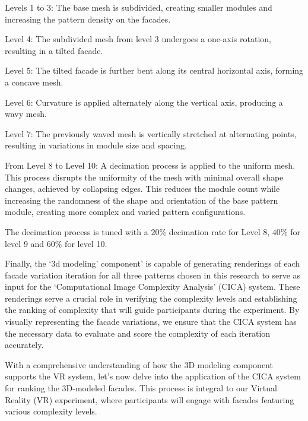Levels 1 to 3: The base mesh is subdivided, creating smaller modules and increasing the pattern density on the facades.

Level 4: The subdivided mesh from level 3 undergoes a one-axis rotation, resulting in a tilted facade.

Level 5: The tilted facade is further bent along its central horizontal axis, forming a concave mesh.

Level 6: Curvature is applied alternately along the vertical axis, producing a wavy mesh.

Level 7: The previously waved mesh is vertically stretched at alternating points, resulting in variations in module size and spacing.

From Level 8 to Level 10: A decimation process is applied to the uniform mesh.
This process disrupts the uniformity of the mesh with minimal overall shape changes\cite{Blender2023}, achieved by collapsing edges.
This reduces the module count while increasing the randomness of the shape and orientation of the base pattern module, creating more complex and varied pattern configurations.

The decimation process is tuned with a \(20\%\) decimation rate for Level 8, \(40\%\) for level 9 and \(60\%\) for level 10.

Finally, the `3d modeling' component' is capable of generating renderings of each facade variation iteration for all three patterns chosen in this research to serve as input for the `Computational Image Complexity Analysis' (CICA) system.
These renderings serve a crucial role in verifying the complexity levels and establishing the ranking of complexity that will guide participants during the experiment.
By visually representing the facade variations, we ensure that the CICA system has the necessary data to evaluate and score the complexity of each iteration accurately.

With a comprehensive understanding of how the 3D modeling component supports the VR system, let's now delve into the application of the CICA system for ranking the 3D-modeled facades.
This process is integral to our Virtual Reality (VR) experiment, where participants will engage with facades featuring various complexity levels.
%
%

